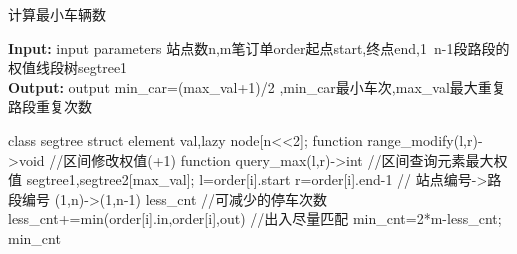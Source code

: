 \begin{algorithm}[h]
    \caption{计算最小车辆数} %
    \hspace*{0.02in} {\bf Input:} %
    input parameters 站点数n,m笔订单order起点start,终点end,1~n-1段路段的权值线段树segtree1\\
    \hspace*{0.02in} {\bf Output:} %
    output min\_car=(max\_val+1)/2 ,min\_car最小车次,max\_val最大重复路段重复次数
    \begin{algorithmic}[1]
    \State class segtree{
        \State struct element{
            \State val,lazy
        \State }node[n<<2];
        \State function range_modify(l,r)->void  //区间修改权值(+1)
        \State function query_max(l,r)->int   //区间查询元素最大权值
    \State }segtree1,segtree2[max\_val];
    \State l=order[i].start
    \State r=order[i].end-1
     // 站点编号->路段编号  (1,n)->(1,n-1)
    \EndFor
    \State less\_cnt //可减少的停车次数
    \State less\_cnt+=min(order[i].in,order[i],out)
        //出入尽量匹配
    \EndFor
    \State min\_cnt=2*m-less\_cnt;
    \State \Return min\_cnt
    \end{algorithmic}
    \end{algorithm}